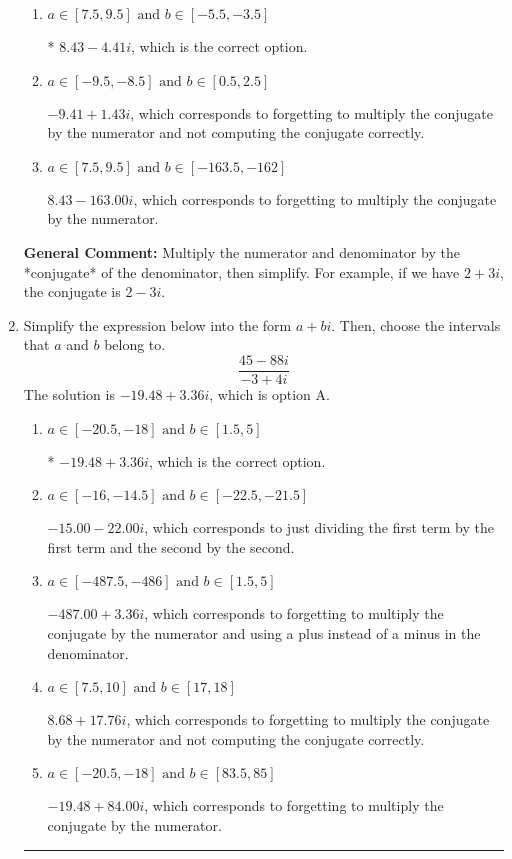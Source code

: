 \documentclass{extbook}[14pt]
\newcommand{\litem}[1]{\item #1

\rule{\textwidth}{0.4pt}}
\begin{document}
\begin{enumerate}
{\begin{enumerate}[label=\Alph*.]
 $312.00  - 4.41 i$, which corresponds to forgetting to multiply the conjugate by the numerator and using a plus instead of a minus in the denominator.
\item \( a \in [7.5, 9.5] \text{ and } b \in [-5.5, -3.5] \)

* $8.43  - 4.41 i$, which is the correct option.
\item \( a \in [-9.5, -8.5] \text{ and } b \in [0.5, 2.5] \)

 $-9.41  + 1.43 i$, which corresponds to forgetting to multiply the conjugate by the numerator and not computing the conjugate correctly.
\item \( a \in [7.5, 9.5] \text{ and } b \in [-163.5, -162] \)

 $8.43  - 163.00 i$, which corresponds to forgetting to multiply the conjugate by the numerator.
\end{enumerate}

\textbf{General Comment:} Multiply the numerator and denominator by the *conjugate* of the denominator, then simplify. For example, if we have $2+3i$, the conjugate is $2-3i$.
}
\litem{
Simplify the expression below into the form $a+bi$. Then, choose the intervals that $a$ and $b$ belong to.
\[ \frac{45 - 88 i}{-3 + 4 i} \]The solution is \( -19.48  + 3.36 i \), which is option A.\begin{enumerate}[label=\Alph*.]
\item \( a \in [-20.5, -18] \text{ and } b \in [1.5, 5] \)

* $-19.48  + 3.36 i$, which is the correct option.
\item \( a \in [-16, -14.5] \text{ and } b \in [-22.5, -21.5] \)

 $-15.00  - 22.00 i$, which corresponds to just dividing the first term by the first term and the second by the second.
\item \( a \in [-487.5, -486] \text{ and } b \in [1.5, 5] \)

 $-487.00  + 3.36 i$, which corresponds to forgetting to multiply the conjugate by the numerator and using a plus instead of a minus in the denominator.
\item \( a \in [7.5, 10] \text{ and } b \in [17, 18] \)

 $8.68  + 17.76 i$, which corresponds to forgetting to multiply the conjugate by the numerator and not computing the conjugate correctly.
\item \( a \in [-20.5, -18] \text{ and } b \in [83.5, 85] \)

 $-19.48  + 84.00 i$, which corresponds to forgetting to multiply the conjugate by the numerator.
\end{enumerate}

}
\end{enumerate}
\end{document}
